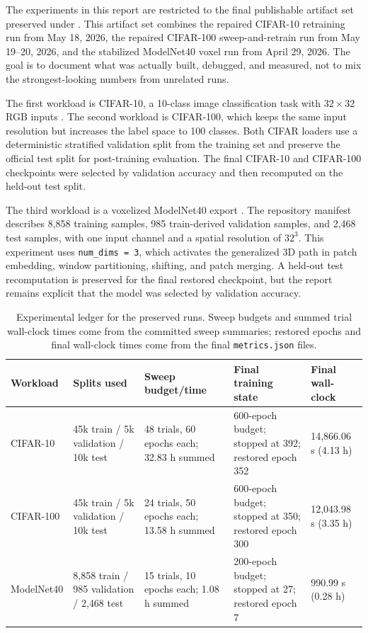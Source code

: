 The experiments in this report are restricted to the final publishable artifact set preserved under . This artifact set combines the repaired CIFAR-10 retraining run from May 18, 2026, the repaired CIFAR-100 sweep-and-retrain run from May 19--20, 2026, and the stabilized ModelNet40 voxel run from April 29, 2026. The goal is to document what was actually built, debugged, and measured, not to mix the strongest-looking numbers from unrelated runs.

The first workload is CIFAR-10, a 10-class image classification task with \(32 \times 32\) RGB inputs \citep{krizhevsky2009cifar}. The second workload is CIFAR-100, which keeps the same input resolution but increases the label space to 100 classes. Both CIFAR loaders use a deterministic stratified validation split from the training set and preserve the official test split for post-training evaluation. The final CIFAR-10 and CIFAR-100 checkpoints were selected by validation accuracy and then recomputed on the held-out test split.

The third workload is a voxelized ModelNet40 export \citep{wu20153dshapenets}. The repository manifest describes 8{,}858 training samples, 985 train-derived validation samples, and 2{,}468 test samples, with one input channel and a spatial resolution of \(32^3\). This experiment uses \texttt{num\_dims = 3}, which activates the generalized 3D path in patch embedding, window partitioning, shifting, and patch merging. A held-out test recomputation is preserved for the final restored checkpoint, but the report remains explicit that the model was selected by validation accuracy.

\begin{table}[t]
  \centering
  \scriptsize
  \caption{Experimental ledger for the preserved runs. Sweep budgets and summed trial wall-clock times come from the committed sweep summaries; restored epochs and final wall-clock times come from the final \texttt{metrics.json} files.}
  \label{tab:experiment-ledger}
  \begin{tabularx}{\linewidth}{@{}lYYYY@{}}
    \toprule
    \textbf{Workload} & \textbf{Splits used} & \textbf{Sweep budget/time} & \textbf{Final training state} & \textbf{Final wall-clock} \\
    \midrule
    CIFAR-10 & 45k train / 5k validation / 10k test & 48 trials, 60 epochs each; 32.83 h summed & 600-epoch budget; stopped at 392; restored epoch 352 & 14{,}866.06 s (4.13 h) \\
    CIFAR-100 & 45k train / 5k validation / 10k test & 24 trials, 50 epochs each; 13.58 h summed & 600-epoch budget; stopped at 350; restored epoch 300 & 12{,}043.98 s (3.35 h) \\
    ModelNet40 & 8{,}858 train / 985 validation / 2{,}468 test & 15 trials, 10 epochs each; 1.08 h summed & 200-epoch budget; stopped at 27; restored epoch 7 & 990.99 s (0.28 h) \\
    \bottomrule
  \end{tabularx}
\end{table}

